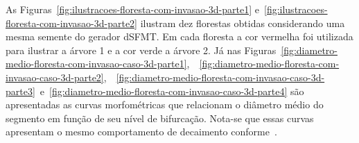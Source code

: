 As Figuras~\ref{fig:ilustracoes-floresta-com-invasao-3d-parte1} e~\ref{fig:ilustracoes-floresta-com-invasao-3d-parte2} ilustram 
dez florestas obtidas considerando uma mesma semente do gerador dSFMT. Em cada floresta a cor vermelha foi utilizada 
para ilustrar a árvore 1 e a cor verde a árvore 2.
Já nas Figuras~\ref{fig:diametro-medio-floresta-com-invasao-caso-3d-parte1},\ 
~\ref{fig:diametro-medio-floresta-com-invasao-caso-3d-parte2},\ 
~\ref{fig:diametro-medio-floresta-com-invasao-caso-3d-parte3}\ 
e~\ref{fig:diametro-medio-floresta-com-invasao-caso-3d-parte4} são apresentadas 
as curvas morfométricas que relacionam o diâmetro médio 
do segmento em função de seu nível de bifurcação. Nota-se que essas curvas apresentam
o mesmo comportamento de decaimento conforme~\cite{Karch1999}.

\clearpage

